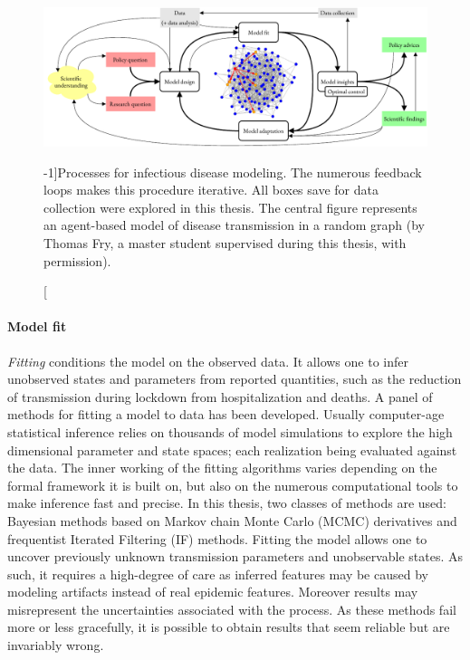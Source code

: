  \begin{figure}\centering
  \includegraphics{fig/modeling_cycle}
  \caption[Processes for infectious disease modeling][-1\baselineskip]{Processes for  infectious disease modeling. The numerous feedback loops makes this procedure iterative. All boxes save for data collection were explored in this thesis. The central figure represents an agent-based model of disease transmission in a random graph (by Thomas Fry, a master student supervised during this thesis, with permission).}\label{fig:modeling}
\end{figure}
\paragraph{Model fit} \textit{Fitting} conditions the model on the observed data. It allows one to infer unobserved states and parameters from reported quantities, such as the reduction of transmission during lockdown from hospitalization and deaths. A panel of methods for fitting a model to data has been developed. Usually computer-age statistical inference relies on thousands of model simulations to explore the high dimensional parameter and state spaces; each realization being evaluated against the data. The inner working of the fitting algorithms varies depending on the formal framework it is built on, but also on the numerous computational tools to make inference fast and precise. In this thesis, two classes of methods are used: Bayesian methods based on Markov chain Monte Carlo (MCMC) derivatives and frequentist Iterated Filtering (IF) methods. Fitting the model allows one to uncover previously unknown transmission parameters and unobservable states. As such, it requires a high-degree of care as inferred features may be caused by modeling artifacts instead of real epidemic features. Moreover results may misrepresent the uncertainties associated with the process. As these methods fail more or less gracefully, it is possible to obtain results that seem reliable but are invariably wrong.
 
